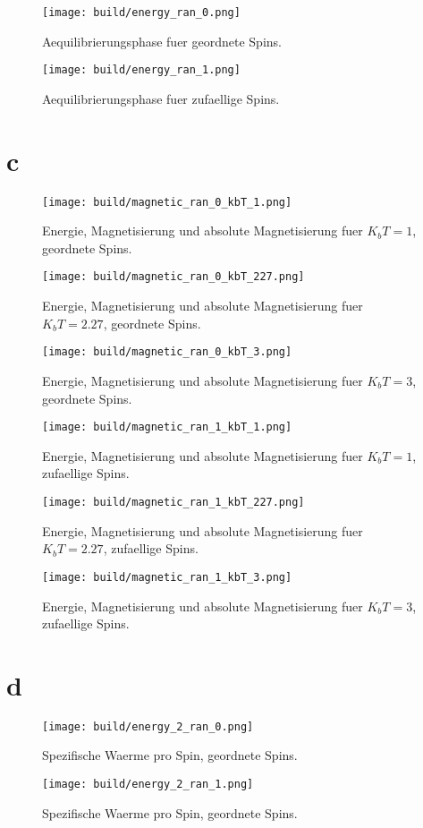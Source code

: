 \documentclass{scrartcl}
\begin{document}
\begin{figure}[ht]
  \centering
  \texttt{[image: build/energy\_ran\_0.png]}
  \caption{Aequilibrierungsphase fuer geordnete Spins.}
\end{figure}
\begin{figure}[ht]
  \centering
  \texttt{[image: build/energy\_ran\_1.png]}
  \caption{Aequilibrierungsphase fuer zufaellige Spins.}
\end{figure}
\FloatBarrier
\newpage
\section*{c}
\begin{figure}[ht]
  \centering
  \texttt{[image: build/magnetic\_ran\_0\_kbT\_1.png]}
  \caption{Energie, Magnetisierung und absolute Magnetisierung fuer $K_b T = 1$, geordnete Spins.}
\end{figure}
\begin{figure}[ht]
  \centering
  \texttt{[image: build/magnetic\_ran\_0\_kbT\_227.png]}
  \caption{Energie, Magnetisierung und absolute Magnetisierung fuer $K_b T = 2.27$, geordnete Spins.}
\end{figure}
\begin{figure}[ht]
  \centering
  \texttt{[image: build/magnetic\_ran\_0\_kbT\_3.png]}
  \caption{Energie, Magnetisierung und absolute Magnetisierung fuer $K_b T = 3$, geordnete Spins.}
\end{figure}
\begin{figure}[ht]
  \centering
  \texttt{[image: build/magnetic\_ran\_1\_kbT\_1.png]}
  \caption{Energie, Magnetisierung und absolute Magnetisierung fuer $K_b T = 1$, zufaellige Spins.}
\end{figure}
\begin{figure}[ht]
  \centering
  \texttt{[image: build/magnetic\_ran\_1\_kbT\_227.png]}
  \caption{Energie, Magnetisierung und absolute Magnetisierung fuer $K_b T = 2.27$, zufaellige Spins.}
\end{figure}
\begin{figure}[ht]
  \centering
  \texttt{[image: build/magnetic\_ran\_1\_kbT\_3.png]}
  \caption{Energie, Magnetisierung und absolute Magnetisierung fuer $K_b T = 3$, zufaellige Spins.}
\end{figure}
\FloatBarrier
\newpage
\section*{d}
\begin{figure}[ht]
  \centering
  \texttt{[image: build/energy\_2\_ran\_0.png]}
  \caption{Spezifische Waerme pro Spin, geordnete Spins.}
\end{figure}
\begin{figure}[ht]
  \centering
  \texttt{[image: build/energy\_2\_ran\_1.png]}
  \caption{Spezifische Waerme pro Spin, geordnete Spins.}
\end{figure}
\FloatBarrier
\newpage
\end{document}

